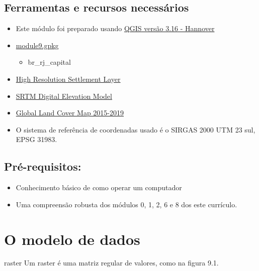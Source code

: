 \documentclass[
  portuguese,
]{krantz}
\providecommand{\tightlist}{%
  \setlength{\itemsep}{0pt}\setlength{\parskip}{0pt}}
\begin{document}
\hypertarget{ferramentas-e-recursos-necessuxe1rios-8}{%
\subsection{Ferramentas e recursos necessários}\label{ferramentas-e-recursos-necessuxe1rios-8}}

\begin{itemize}
\tightlist
\item
  Este módulo foi preparado usando \href{https://qgis.org/en/site/forusers/download.html}{QGIS versão 3.16 - Hannover}
\item
  \href{data/module9.gpkg}{module9.gpkg}

  \begin{itemize}
  \tightlist
  \item
    br\_rj\_capital
  \end{itemize}
\item
  \href{data/hrsl_rj_capital_populacao.tif}{High Resolution Settlement Layer}
\item
  \href{data/SRTM_DEM}{SRTM Digital Elevation Model}
\item
  \href{data/Global_Land_Cover_Map}{Global Land Cover Map 2015-2019}
\item
  O sistema de referência de coordenadas usado é o SIRGAS 2000 UTM 23 sul, EPSG 31983.
\end{itemize}

\hypertarget{pruxe9-requisitos-9}{%
\subsection{Pré-requisitos:}\label{pruxe9-requisitos-9}}

\begin{itemize}
\tightlist
\item
  Conhecimento básico de como operar um computador
\item
  Uma compreensão robusta dos módulos 0, 1, 2, 6 e 8 dos este currículo.
\end{itemize}

\hypertarget{o-modelo-de-dados}{%
\section{O modelo de dados}\label{o-modelo-de-dados}}

raster Um raster é uma matriz regular de valores, como na figura 9.1.
\end{document}
